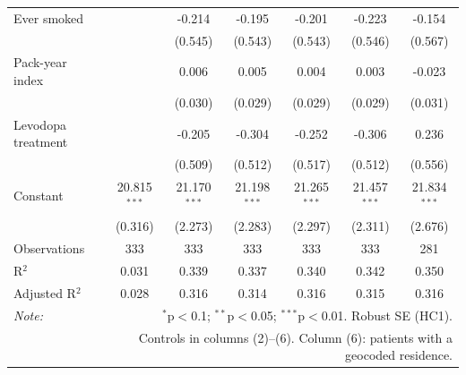 \begin{tabular}{lcccccc}
Ever smoked &  & -0.214 & -0.195 & -0.201 & -0.223 & -0.154 \\
 &  & (0.545) & (0.543) & (0.543) & (0.546) & (0.567) \\
Pack-year index &  & 0.006 & 0.005 & 0.004 & 0.003 & -0.023 \\
 &  & (0.030) & (0.029) & (0.029) & (0.029) & (0.031) \\
Levodopa treatment &  & -0.205 & -0.304 & -0.252 & -0.306 & 0.236 \\
 &  & (0.509) & (0.512) & (0.517) & (0.512) & (0.556) \\
Constant & 20.815$^{***}$ & 21.170$^{***}$ & 21.198$^{***}$ & 21.265$^{***}$ & 21.457$^{***}$ & 21.834$^{***}$ \\
 & (0.316) & (2.273) & (2.283) & (2.297) & (2.311) & (2.676) \\
\hline
Observations & 333 & 333 & 333 & 333 & 333 & 281 \\
R$^2$ & 0.031 & 0.339 & 0.337 & 0.340 & 0.342 & 0.350 \\
Adjusted R$^2$ & 0.028 & 0.316 & 0.314 & 0.316 & 0.315 & 0.316 \\
\hline\hline
\textit{Note:} & \multicolumn{6}{r}{$^{*}$p$<$0.1; $^{**}$p$<$0.05; $^{***}$p$<$0.01. Robust SE (HC1).} \\
 & \multicolumn{6}{r}{Controls in columns (2)--(6). Column (6): patients with a geocoded residence.} \\
\end{tabular}
